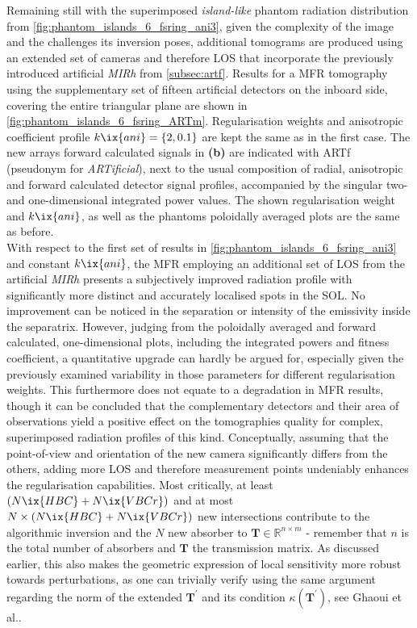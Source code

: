                 Remaining still with the superimposed \textit{island-like} phantom radiation distribution from \cref{fig:phantom_islands_6_fsring_ani3}, given the complexity of the image and the challenges its inversion poses, additional tomograms are produced using an extended set of cameras and therefore LOS that incorporate the previously introduced artificial \textit{MIRh} from \cref{subsec:artf}. Results for a MFR tomography using the supplementary set of fifteen artificial detectors on the inboard side, covering the entire triangular plane are shown in \cref{fig:phantom_islands_6_fsring_ARTm}. Regularisation weights and anisotropic coefficient profile $k\ix{ani}=\left\{2, 0.1\right\}$ are kept the same as in the first case. The new arrays forward calculated signals in \textbf{(b)} are indicated with ARTf (pseudonym for \textit{ARTificial}), next to the usual composition of radial, anisotropic and forward calculated detector signal profiles, accompanied by the singular two- and one-dimensional integrated power values. The shown regularisation weight and $k\ix{ani}$, as well as the phantoms poloidally averaged plots are the same as before.\\%
                With respect to the first set of results in \cref{fig:phantom_islands_6_fsring_ani3} and constant $k\ix{ani}$, the MFR employing an additional set of LOS from the artificial \textit{MIRh} presents a subjectively improved radiation profile with significantly more distinct and accurately localised spots in the SOL. No improvement can be noticed in the separation or intensity of the emissivity inside the separatrix. However, judging from the poloidally averaged and forward calculated, one-dimensional plots, including the integrated powers and fitness coefficient, a quantitative upgrade can hardly be argued for, especially given the previously examined variability in those parameters for different regularisation weights. This furthermore does not equate to a degradation in MFR results, though it can be concluded that the complementary detectors and their area of observations yield a positive effect on the tomographies quality for complex, superimposed radiation profiles of this kind. Conceptually, assuming that the point-of-view and orientation of the new camera significantly differs from the others, adding more LOS and therefore measurement points undeniably enhances the regularisation capabilities. Most critically, at least $\left(N\ix{HBC}+N\ix{VBCr}\right)$ and at most $N\times\left(N\ix{HBC}+N\ix{VBCr}\right)$ new intersections contribute to the algorithmic inversion and the $N$ new absorber to $\mathbf{T}\in\mathbb{R}^{n\times m}$ - remember that $n$ is the total number of absorbers and $\mathbf{T}$ the transmission matrix. As discussed earlier, this also makes the geometric expression of local sensitivity more robust towards perturbations, as one can trivially verify using the same argument regarding the norm of the extended $\mathbf{T}^{\prime}$ and its condition $\kappa\left(\mathbf{T}^{\prime}\right)$, see Ghaoui et al.\cite{Ghaoui2002}.%
%
